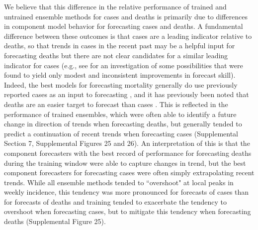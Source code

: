 \documentclass[11pt,3p,authoryear]{elsarticle}
\begin{document}
We believe that this difference in the relative performance of trained and untrained ensemble methods for cases and deaths is primarily due to differences in component model behavior for forecasting cases and deaths.
A fundamental difference between these outcomes is that cases are a leading indicator relative to deaths, so that trends in cases in the recent past may be a helpful input for forecasting deaths \textemdash but there are not clear candidates for a similar leading indicator for cases (e.g., see \cite{mcdonald_auxiliary_indicators_covid_2021} for an investigation of some possibilities that were found to yield only modest and inconsistent improvements in forecast skill).
Indeed, the best models for forecasting mortality generally do use previously reported cases as an input to forecasting \citep{cramerEvaluationIndividualEnsemble2022}, and it has previously been noted that deaths are an easier target to forecast than cases \citep{2021Reich_covid_predictability_blog, bracher_preregistered_covid_de_pl_2021}.
This is reflected in the performance of trained ensembles, which were often able to identify a future change in direction of trends when forecasting deaths, but generally tended to predict a continuation of recent trends when forecasting cases (Supplemental Section 7, Supplemental Figures 25 and 26).
An interpretation of this is that the component forecasters with the best record of performance for forecasting deaths during the training window were able to capture changes in trend, but the best component forecasters for forecasting cases were often simply extrapolating recent trends.
While all ensemble methods tended to ``overshoot" at local peaks in weekly incidence, this tendency was more pronounced for forecasts of cases than for forecasts of deaths \textemdash and training tended to exacerbate the tendency to overshoot when forecasting cases, but to mitigate this tendency when forecasting deaths (Supplemental Figure 25).

\end{document}
